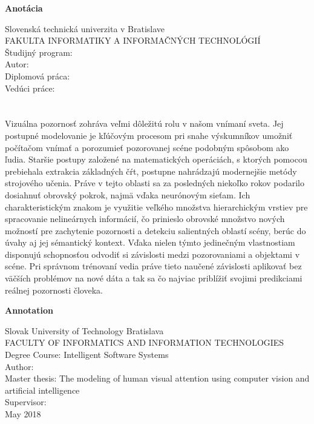 \newpage
\cleardoublepage
\thispagestyle{plain}
\begin{center}
\begin{Large}
\textbf{Anotácia} \\
\end{Large}
\end{center}
Slovenská technická univerzita v Bratislave \\
FAKULTA INFORMATIKY A INFORMAČNÝCH TECHNOLÓGIÍ \\
\noindent
Študijný program: \Program \\
\noindent
Autor: \Author \\
{Diplomová práca: }\Title \\
Vedúci práce: \Supervisor \\
\Month\ \Year \\
\noindent
\\

Vizuálna pozornosť zohráva veľmi dôležitú rolu v našom vnímaní sveta. Jej postupné modelovanie je kľúčovým procesom pri snahe výskumníkov umožniť počítačom vnímať a porozumieť pozorovanej scéne podobným spôsobom ako ľudia. Staršie postupy založené na matematických operáciách, s ktorých pomocou prebiehala extrakcia základných čŕt, postupne nahrádzajú modernejšie metódy strojového učenia. Práve v tejto oblasti sa za posledných niekoľko rokov podarilo dosiahnuť obrovský pokrok, najmä vďaka neurónovým sieťam. Ich charakteristickým znakom je využitie veľkého množstva hierarchickým vrstiev pre spracovanie nelineárnych informácií, čo prinieslo obrovské množstvo nových možností pre zachytenie pozornosti a detekciu salientných oblastí scény, berúc do úvahy aj jej sémantický kontext. Vďaka nielen týmto jedinečným vlastnostiam disponujú schopnosťou odvodiť si závislosti medzi pozorovaniami a objektami v scéne. Pri správnom trénovaní vedia práve tieto naučené závislosti aplikovať bez väčších problémov na nové dáta a tak sa čo najviac priblížiť svojimi predikciami reálnej pozornosti človeka.

\newpage
\null

\newpage
\cleardoublepage
\thispagestyle{plain}
\begin{center}
\begin{Large}
\textbf{Annotation} \\
\end{Large}
\end{center}
Slovak University of Technology Bratislava \\
FACULTY OF INFORMATICS AND INFORMATION TECHNOLOGIES \\
\noindent
Degree Course: Intelligent Software Systems \\
\noindent
Author: \Author \\
{Master thesis: } The modeling of human visual attention using computer vision and artificial intelligence \\
Supervisor: \Supervisor \\
May 2018 \\
\noindent
\\


